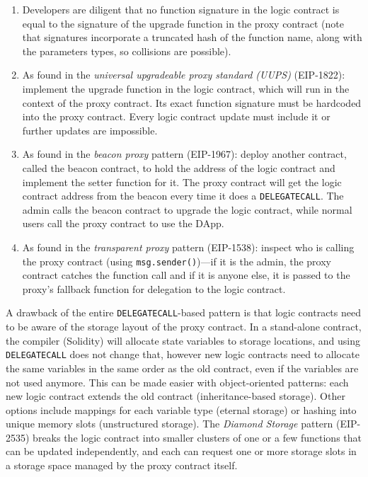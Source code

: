 \begin{enumerate}

\item Developers are diligent that no function signature in the logic contract is equal to the signature of the upgrade function in the proxy contract (note that signatures incorporate a truncated hash of the function name, along with the parameters types, so collisions are possible). 

\item As found in the \emph{universal upgradeable proxy standard (UUPS)} (EIP-1822): implement the upgrade function in the logic contract, which will run in the context of the proxy contract. Its exact function signature must be hardcoded into the proxy contract. Every logic contract update must include it or further updates are impossible.

\item As found in the \textit{beacon proxy} pattern (EIP-1967): deploy another contract, called the beacon contract, to hold the address of the logic contract and implement the setter function for it. The proxy contract will get the logic contract address from the beacon every time it does a \texttt{DELEGATECALL}. The admin calls the beacon contract to upgrade the logic contract, while normal users call the proxy contract to use the DApp. 

\item As found in the \textit{transparent proxy} pattern (EIP-1538): inspect who is calling the proxy contract (using \texttt{msg.sender()})---if it is the admin, the proxy contract catches the function call and if it is anyone else, it is passed to the proxy's fallback function for delegation to the logic contract. 

\end{enumerate}

A drawback of the entire \texttt{DELEGATECALL}-based pattern is that logic contracts need to be aware of the storage layout of the proxy contract. In a stand-alone contract, the compiler (\eg Solidity) will allocate state variables to storage locations, and using \texttt{DELEGATECALL} does not change that, however new logic contracts need to allocate the same variables in the same order as the old contract, even if the variables are not used anymore. This can be made easier with object-oriented patterns: each new logic contract extends the old contract (inheritance-based storage). Other options include mappings for each variable type (eternal storage) or hashing into unique memory slots (unstructured storage). The \textit{Diamond Storage} pattern (EIP-2535) breaks the logic contract into smaller clusters of one or a few functions that can be updated independently, and each can request one or more storage slots in a storage space managed by the proxy contract itself. 


